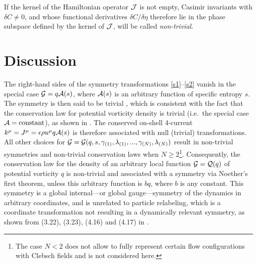 \documentclass{article}
\numberwithin{equation}{section}
\begin{document}
If the kernel of the Hamiltonian operator ${\cal J}$ is not empty, Casimir invariants with $\delta C \ne 0$, and whose functional derivatives $\delta C/\delta\eta$ therefore lie in the phase subspace defined by the kernel of ${\cal J}$, will be called {\it non-trivial}.

\section{Discussion}\label{disc}
The right-hand sides of the symmetry transformations \eqref{s1}--\eqref{s2} vanish in the special case ${\cal G}=q{\cal A}(s)$, where ${\cal A}(s)$ is an arbitrary function of specific entropy $s$. The symmetry is then said to be trivial \citep{Olver93}, which is consistent with the fact that the conservation law for potential vorticity density is trivial (i.e.\ the special case ${\cal A}=\text{constant}$), as shown in \citet{Charron18b, Charron18}. The conserved on-shell 4-current $k^\mu=J^\mu=\epsilon \rho u^\mu q{\cal A}(s)$ is therefore associated with null (trivial) transformations. All other choices for ${\cal G}={\cal G}(q,s,\gamma_{(1)},\lambda_{(1)},...,\gamma_{(N)},\lambda_{(N)})$ result in non-trivial symmetries and non-trivial conservation laws when $N \ge 2$\footnote[3]{The case $N < 2$ does not allow to fully represent certain flow configurations with Clebsch fields and is not considered here.}. Consequently, the conservation law for the density of an arbitrary local function ${\cal G}={\cal Q}(q)$ of potential vorticity $q$ is non-trivial and associated with a symmetry via Noether's first theorem, unless this arbitrary function is $bq$, where $b$ is any constant. This symmetry is a global internal---or global gauge---symmetry of the dynamics in arbitrary coordinates, and is unrelated to particle relabeling, which is a coordinate transformation not resulting in a dynamically relevant symmetry, as shown from (3.22), (3.23), (4.16) and (4.17) in \citet{Charron18}.
\end{document}
